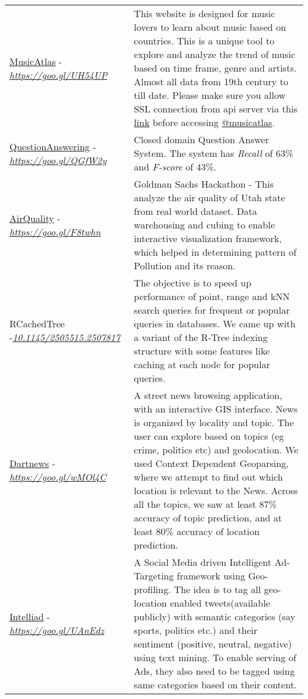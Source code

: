 \documentclass[8pt]{article}
\begin{document}
\begin{tabular}[t]{@{}p{\textwidth-\rcollength-180pt}p{\rcollength+180pt}}
        \href{https://musicatlas.github.io/}{MusicAtlas} -\href{https://goo.gl/UH54UP}{\textit{https://goo.gl/UH54UP}} & \hspace{0.5cm}  This website is designed for music lovers to learn about music based on countries. This is a unique tool to explore and analyze the trend of music based on time frame, genre and artists. Almost all data from 19th century to till date. Please make sure you allow SSL connection from api server via this \href{https://db03.cs.utah.edu:8181/api/country_track}{link} before accessing \href{https://musicatlas.github.io/musicatlas/}{@musicatlas}.\\[0.1cm]
        \href{https://github.com/debjyoti385/QuestionAnswerNLP}{QuestionAnswering} -\href{https://goo.gl/QGfW2y}{\textit{https://goo.gl/QGfW2y}} & \hspace{0.5cm}  Closed domain Question Answer System. The system has \emph{Recall} of  63\% and \emph{F-score} of 43\%.   \\[0.1cm]
        \href{http://debjyoti385.github.io/AirQuality/}{AirQuality} -\href{https://goo.gl/F8twhn}{\textit{https://goo.gl/F8twhn}}  & \hspace{0.5cm}  Goldman Sachs Hackathon - This analyze the air quality of Utah state from real world dataset. Data warehousing and cubing to enable interactive visualization framework, which helped in determining pattern of Pollution and its reason. \\
        RCachedTree -\href{https://doi.org/10.1145/2505515.2507817}{\textit{10.1145/2505515.2507817}} & \hspace{0.5cm}  The objective is to speed up performance of point, range and kNN search queries for frequent or popular queries in databases. We came up with a variant of the R-Tree indexing structure with some features like caching at each node for popular queries.\\ 
        \href{https://goo.gl/wMOl4C}{Dartnews} -\href{https://goo.gl/wMOl4C}{\textit{https://goo.gl/wMOl4C}}  & \hspace{0.5cm} A street news browsing application, with an interactive GIS interface. News is organized by locality and topic. The user can explore based on topics (eg crime, politics etc) and geolocation. We used Context Dependent Geoparsing, where we attempt to find out which location is relevant to the News. Across all the topics, we saw at least 87\% accuracy of topic prediction, and at least 80\% accuracy of location prediction.\\
        \href{http://github.com/debjyoti385/intelliad}{Intelliad} -\href{https://goo.gl/UAnEdz}{\textit{https://goo.gl/UAnEdz}} & \hspace{0.5cm} A Social Media driven Intelligent Ad-Targeting framework using Geo-profiling. The idea is to tag all geo-location enabled tweets(available publicly) with semantic categories (say sports, politics etc.) and their sentiment (positive, neutral, negative) using text mining. To enable serving of Ads, they also need to be tagged using same categories based on their content. \\

\end{tabular}
\end{document}
